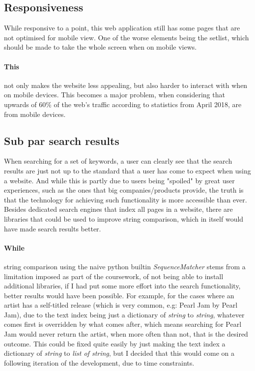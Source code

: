 \documentclass[10pt, a4paper]{article}
\begin{document}
	\subsection{Responsiveness}
	While responsive to a point, this web application still has some pages that are not optimised for mobile view.
	One of the worse elements being the setlist, which should be made to take the whole screen when on mobile views.
	\paragraph{This} not only makes the website less appealing, but also harder to interact with when on mobile devices. This becomes a major problem, when considering that upwards of 60\% of the web's traffic according to statistics from April 2018, are from mobile devices\cite{Enge_2018}.
	
	\subsection{Sub par search results}
	When searching for a set of keywords, a user can clearly see that the search results are just not up to the standard that a user has come to expect when using a website. And while this is partly due to users being "spoiled" by great user experiences, such as the ones that big companies/products provide, the truth is that the technology for achieving such functionality is more accessible than ever. Besides dedicated search engines that index all pages in a website, there are libraries that could be used to improve string comparison, which in itself would have made search results better.
	\paragraph{While} string comparison using the naive python builtin \textit{SequenceMatcher}  stems from a limitation imposed as part of the coursework, of not being able to install additional libraries, if I had put some more effort into the search functionality, better results would have been possible. For example, for the cases where an artist has a self-titled release (which is very common, e.g: Pearl Jam by Pearl Jam), due to the text index being just a dictionary of \textit{string} to \textit{string}, whatever comes first is overridden by what comes after, which means searching for Pearl Jam would never return the artist, when more often than not, that is the desired outcome.
	This could be fixed quite easily by just making the text index a dictionary of \textit{string} to \textit{list of string}, but I decided that this would come on a following iteration of the development, due to time constraints.
	
\end{document}

